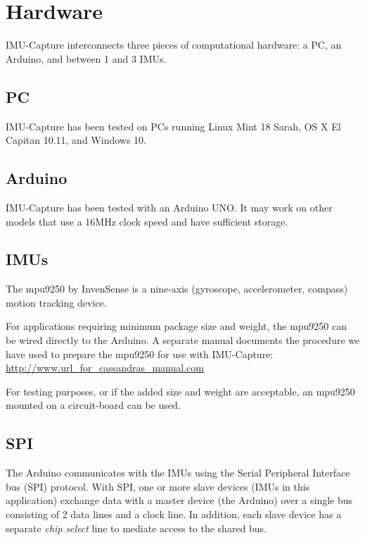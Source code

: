 \documentclass[11pt,letterpaper,article,oneside]{memoir}
\newcommand{\name}{IMU-Capture}
\begin{document}

\chapter{Hardware}

\name{} interconnects three pieces of computational hardware: a PC, an Arduino,
and between 1 and 3 IMUs.


\section{PC}
\name{} has been tested on PCs running Linux Mint 18 Sarah, OS X El Capitan
10.11, and Windows 10.


\section{Arduino}
\name{} has been tested with an Arduino UNO. It may work on other models that
use a 16MHz clock speed and have sufficient storage.


\section{IMUs}
The mpu9250 by InvenSense is a nine-axis (gyroscope, accelerometer, compass)
motion tracking device.

For applications requiring minimum package size and weight,
the mpu9250 can be wired directly to the Arduino. A separate manual
documents the procedure we have used to prepare the mpu9250 for use with
\name{}:
\url{http://www.url_for_cassandras_manual.com}

For testing purposes, or if the added size and weight are acceptable, an mpu9250
mounted on a circuit-board can be used.


\section{SPI}
The Arduino communicates with the IMUs using the Serial Peripheral Interface bus
(SPI) protocol. With SPI, one or more slave devices (IMUs in this application)
exchange data with a master device (the Arduino) over a single bus consisting of
2 data lines and a clock line. In addition, each slave device has a separate
\emph{chip select} line to mediate access to the shared bus.
\end{document}
